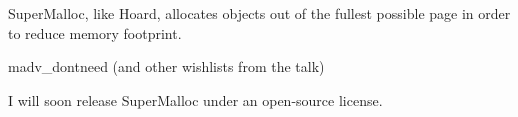\documentclass[pldi]{sigplanconf-pldi15}
\begin{document}

SuperMalloc, like Hoard, allocates objects out of the fullest possible page in order to reduce memory footprint.

madv\_dontneed (and other wishlists from the talk)

I will soon release SuperMalloc under an open-source license.

{\raggedright


}

\end{document}
